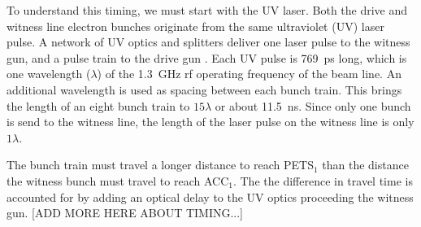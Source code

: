 \documentclass[portrait,final,paperwidth=120cm, paperheight=240cm,  fontscale=0.277]{baposter}
\begin{document}
\begin{poster}
{To understand this timing, we must start with the UV laser.
Both the drive and witness line electron bunches
originate from the same ultraviolet (UV) laser pulse. 
A network of UV optics and splitters deliver one laser 
pulse to the witness gun, and a pulse train to the drive gun \cite{korea}.
Each UV pulse is \SI{769}{ps} long, which is one wavelength ($\lambda$)
of the \SI{1.3}{GHz} rf operating frequency of the beam line.  
An additional wavelength is used as spacing between each bunch train.
This brings the length of an eight bunch train to $15\lambda$ or about \SI{11.5}{ns}.
Since only one bunch is send to the witness line, the length of the 
laser pulse on the witness line is only $1\lambda$.

The bunch train must travel a longer distance to reach PETS$_1$ 
than the distance the witness bunch must travel to reach ACC$_1$.
The the difference in travel time is accounted for by adding an optical delay 
to the UV optics proceeding the witness gun. 
[ADD MORE HERE ABOUT TIMING...]
}

\end{poster}
\end{document}
